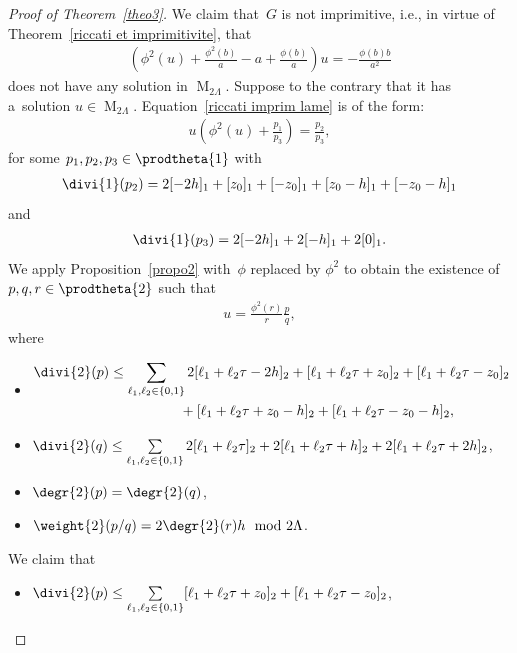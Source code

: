 \documentclass[pdftex]{sigma}
\numberwithin{equation}{section}
\begin{document}
\begin{proof}[Proof of Theorem~\ref{theo3}]
We claim that~$G$ is not imprimitive, i.e., in virtue of Theorem~\ref{riccati et imprimitivite}, that
\begin{gather}
\label{riccati imprim lame}
\left(\phi^{2}(u)+\frac{\phi^{2}(b)}{a}-a+\frac{\phi(b)}{a} \right)u=-\frac{\phi(b)b}{a^{2}}
\end{gather}
does not have any solution in $\operatorname{M}_{2\Lambda}$.
Suppose to the contrary that it has a~solution $u \in \operatorname{M}_{2\Lambda}$.
Equation~\eqref{riccati imprim lame} is of the form:
\begin{gather*}
u\left(\phi^{2}(u)+\frac{p_{1}}{p_{3}}\right)=\frac{p_{2}}{p_{3}},
\end{gather*}
for some $p_{1},p_{2},p_{3}\in \prodtheta{1}$ with
\begin{gather*}
\divi{1} (p_{2})=2[-2h]_{1}+[z_{0}]_{1}+[-z_{0}]_{1}+[z_{0}-h]_{1}+[-z_{0}-h]_{1}
\end{gather*}
and
\begin{gather*}
\divi{1} (p_{3})=2[-2h]_{1}+2[-h]_{1}+2[0]_{1}.
\end{gather*}
We apply Proposition~\ref{propo2} with~$\phi$ replaced by $\phi^2$ to obtain the existence of $p,q,r\in \prodtheta{2}$
such that
\begin{gather*}
u= \frac{\phi^{2}(r)}{r}\frac{p}{q},
\end{gather*}
where
\begin{itemize}\itemsep=0pt
\item[(v)]
\begin{gather*}
 \divi{2} (p)  \leq \sum\limits_{\ell_{1},\ell_{2} \in
\{0,1\}} 2[\ell_{1}+\ell_{2}\tau-2h]_{2}+[\ell_{1}+\ell_{2}\tau+z_{0}]_{2}+[\ell_{1}+\ell_{2}\tau-z_{0}]_{2}
\\
\hphantom{\divi{2} (p)  \leq}{} +[\ell_{1}+\ell_{2}\tau+z_{0}-h]_{2}+[\ell_{1}+\ell_{2}\tau-z_{0}-h]_{2},
\end{gather*}
\item[(vi)] $\divi{2} (q) \leq \sum\limits_{\ell_{1},\ell_{2} \in
\{0,1\}}2[\ell_{1}+\ell_{2}\tau]_{2}+2[\ell_{1}+\ell_{2}\tau+h]_{2}+2[\ell_{1}+\ell_{2}\tau+2h]_{2}$,
\item[(vii)] $\degr{2} (p)=\degr{2} (q)$,
\item[(viii)] $\weight{2} (p/q)=2\degr{2} (r) h \mod 2\Lambda$.
\end{itemize}
We claim that
\begin{itemize}
\itemsep=0pt
\item[(v$'$)] $\divi{2} (p) \leq \sum\limits_{\ell_{1},\ell_{2} \in
\{0,1\}}[\ell_{1}+\ell_{2}\tau+z_{0}]_{2}+[\ell_{1}+\ell_{2}\tau-z_{0}]_{2}$,

\end{itemize}
\end{proof}
\end{document}
